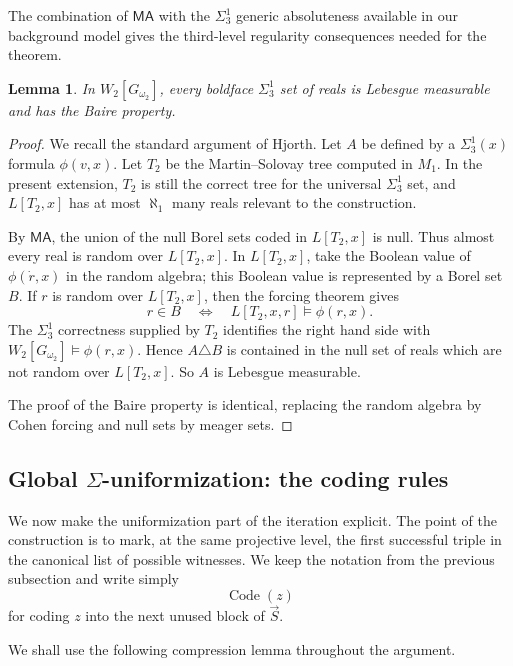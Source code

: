 \documentclass[a4paper,11pt]{article}
\newtheorem{lemma}[theorem]{Lemma}
\begin{document}
The combination of $\mathsf{MA}$ with the $\Sigma^1_3$ generic absoluteness available in our background model gives the third-level regularity consequences needed for the theorem.

\begin{lemma}\label{HjorthsLemma}
In $W_2[G_{\omega_2}]$, every boldface $\Sigma^1_3$ set of reals is Lebesgue measurable and has the Baire property.
\end{lemma}

\begin{proof}
We recall the standard argument of Hjorth.  Let $A$ be defined by a $\Sigma^1_3(x)$ formula $\phi(v,x)$.  Let $T_2$ be the Martin--Solovay tree computed in $M_1$.  In the present extension, $T_2$ is still the correct tree for the universal $\Sigma^1_3$ set, and $L[T_2,x]$ has at most $\aleph_1$ many reals relevant to the construction.

By $\mathsf{MA}$, the union of the null Borel sets coded in $L[T_2,x]$ is null.  Thus almost every real is random over $L[T_2,x]$.  In $L[T_2,x]$, take the Boolean value of $\phi(\dot r,x)$ in the random algebra; this Boolean value is represented by a Borel set $B$.  If $r$ is random over $L[T_2,x]$, then the forcing theorem gives
\[
r\in B \quad\Longleftrightarrow\quad L[T_2,x,r]\models \phi(r,x).
\]
The $\Sigma^1_3$ correctness supplied by $T_2$ identifies the right hand side with $W_2[G_{\omega_2}]\models\phi(r,x)$.  Hence $A\triangle B$ is contained in the null set of reals which are not random over $L[T_2,x]$.  So $A$ is Lebesgue measurable.

The proof of the Baire property is identical, replacing the random algebra by Cohen forcing and null sets by meager sets.
\end{proof}

\subsection{Global $\Sigma$-uniformization: the coding rules}\label{subsec:forcing-global-sigma-uniformization}

We now make the uniformization part of the iteration explicit.  The point of the construction is to mark, at the same projective level, the first successful triple in the canonical list of possible witnesses.  We keep the notation from the previous subsection and write simply
\[
\operatorname{Code}(z)
\]
for coding $z$ into the next unused block of $\vec S$.

We shall use the following compression lemma throughout the argument.
\end{document}
